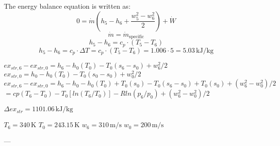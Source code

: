 The energy balance equation is written as:  
\[ 0 = \dot{m} \left( h_5 - h_6 + \frac{w_5^2 - w_6^2}{2} \right) + \dot{W} \]  
\[ \dot{m} = \dot{m}_\text{specific} \]  
\[ h_5 - h_6 = c_p \cdot (T_5 - T_6) \]  
\[ h_5 - h_6 = c_p \cdot \Delta T = c_p \cdot (T_5 - T_6) = 1.006 \cdot 5 = 5.03 \, \text{kJ/kg} \]

\( ex_{str,6} - ex_{str,0} = h_6 - h_0(T_0) - T_0(s_6 - s_0) + w_6^2 / 2 \)  
\( ex_{str,0} = h_0 - h_0(T_0) - T_0(s_0 - s_0) + w_0^2 / 2 \)  
\( ex_{str,6} - ex_{str,0} = h_6 - h_0 - h_0(T_0) + T_0(s_0) - T_0(s_6 - s_0) + T_0(s_0) + (w_6^2 - w_0^2) / 2 \)  
\( = cp(T_6 - T_0) - T_0[ln(T_6 / T_0)] - R ln(p_6 / p_0) + (w_6^2 - w_0^2) / 2 \)  

\( \Delta ex_{str} = 1101.06 \, \text{kJ/kg} \)  

\( T_6 = 340 \, \text{K} \)  
\( T_0 = 243.15 \, \text{K} \)  
\( w_6 = 310 \, \text{m/s} \)  
\( w_0 = 200 \, \text{m/s} \)  

---